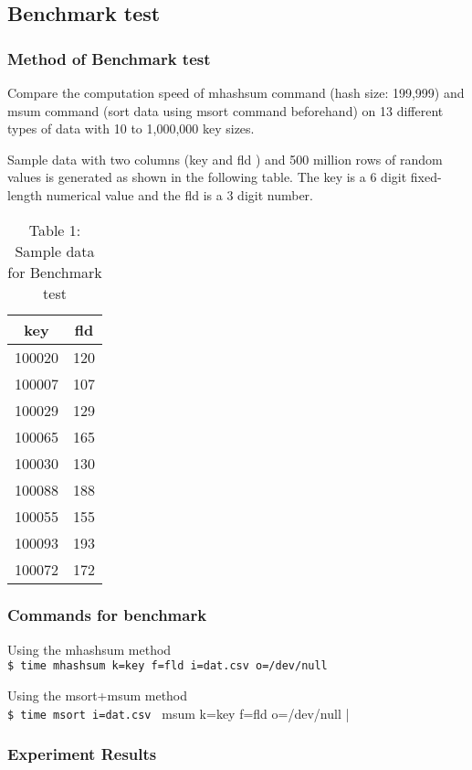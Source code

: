 \documentclass[a4paper]{jarticle}
\begin{document}
\subsection*{Benchmark test}
\subsubsection*{Method of Benchmark test}
Compare the computation speed of mhashsum command (hash size: 199,999) and msum command (sort data using msort command beforehand) on 13 different types of data with 10 to 1,000,000 key sizes. 

Sample data with two columns (key and fld ) and 500 million rows of random values is generated as shown in the following table. 
The key is a 6 digit fixed-length numerical value and the fld is a 3 digit number. 

\begin{table}[h]
\begin{center}
 \caption{Table 1: Sample data for Benchmark test }
 \begin{tabular}{|c|c|}
  \hline
key & fld \\ \hline \hline
100020&120 \\ \hline
100007&107 \\ \hline
100029&129 \\ \hline
100065&165 \\ \hline
100030&130 \\ \hline
100088&188 \\ \hline
100055&155 \\ \hline
100093&193 \\ \hline
100072&172 \\ \hline
 \end{tabular}
\end{center}
\end{table}

\subsubsection*{Commands for benchmark}
Using the mhashsum method\\
\verb|$ time mhashsum k=key f=fld i=dat.csv o=/dev/null |

Using the msort+msum method\\
\verb|$ time msort i=dat.csv | msum k=key f=fld o=/dev/null |

\subsubsection*{Experiment Results}
\end{document}
